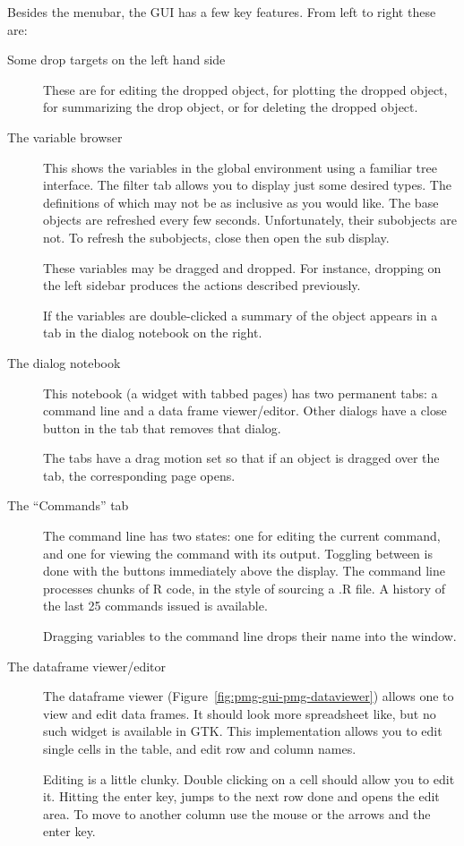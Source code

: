 \documentclass[12pt]{article}
\begin{document}
Besides the menubar, the GUI has a few key features. From left to
right these are:
\begin{description}
\item[Some drop targets on the left hand side] These are for editing the
  dropped object, for plotting the dropped object, for summarizing the
  drop object, or for deleting the dropped object.
\item[The variable browser] This shows the variables in the global
  environment using a familiar tree interface. The filter tab allows
  you to display just some desired types. The definitions of which may
  not be as inclusive as you would like. The base objects are
  refreshed every few seconds. Unfortunately, their subobjects are
  not. To refresh the subobjects, close then open the sub display.

  These variables may be dragged and dropped. For instance, dropping
  on the left sidebar produces the actions described previously.

  If the variables are double-clicked a summary of the object appears
  in a tab in the dialog notebook on the right.
\item[The dialog notebook] This notebook (a widget with tabbed pages)
  has two permanent tabs: a command line and a data frame
  viewer/editor. Other dialogs have a close button in the tab that
  removes that dialog.

  The tabs have a drag motion set so that if an object is dragged over
  the tab, the corresponding page opens.
\item[The ``Commands'' tab]  The command line has two states: one for
  editing the current command, and one for viewing the command with
  its output. Toggling between is done with the buttons immediately
  above the display. The command line processes chunks of R code,
  in the style of sourcing a .R file. A history of the last 25
  commands issued is available. 

  Dragging variables to the command line drops their name into the window.
\item[The dataframe viewer/editor] The dataframe viewer
  (Figure~\ref{fig:pmg-gui-pmg-dataviewer}) allows one to
  view and edit data frames. It should look more spreadsheet like, but
  no such widget is available in GTK. This implementation allows you
  to edit single cells in the table, and edit row and column names. 

  Editing is a little clunky. Double clicking on a cell should allow
  you to edit it. Hitting the enter key, jumps to the next row done
  and opens the edit area. To move to another column use the mouse or
  the arrows and the enter key.
  

\end{description}
\end{document}
